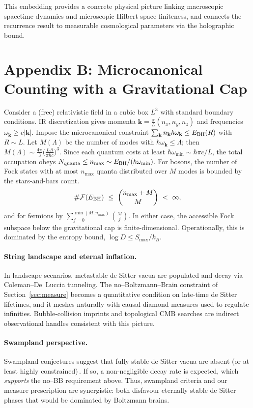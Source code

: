 \documentclass[12pt]{article}
\newcommand{\Smax}{S_{\max}}
\theoremstyle{remark}
\begin{document}
This embedding provides a concrete physical picture linking macroscopic spacetime dynamics and microscopic Hilbert space finiteness, and connects the recurrence result to measurable cosmological parameters via the holographic bound.

\section*{Appendix B: Microcanonical Counting with a Gravitational Cap}
\label{app:microcanonical}

Consider a (free) relativistic field in a cubic box $L^3$ with standard boundary conditions. IR discretization gives momenta $\mathbf k=\frac{\pi}{L}(n_x,n_y,n_z)$ and frequencies $\omega_{\mathbf k}\ge c|\mathbf k|$. Impose the microcanonical constraint $\sum_{\mathbf k} n_{\mathbf k}\hbar\omega_{\mathbf k}\le E_{\rm BH}(R)$ with $R\sim L$.
Let $M(\Lambda)$ be the number of modes with $\hbar\omega_{\mathbf k}\le \Lambda$; then $M(\Lambda)\sim \frac{4\pi}{3}\big(\frac{L\Lambda}{\pi\hbar c}\big)^3$. Since each quantum costs at least $\hbar\omega_{\min}\sim \hbar\pi c/L$, the total occupation obeys $N_{\text{quanta}}\le n_{\max}\sim E_{\rm BH}/(\hbar\omega_{\min})$.
For bosons, the number of Fock states with at most $n_{\max}$ quanta distributed over $M$ modes is bounded by the stars-and-bars count.
\[
\#\mathcal{F}(E_{\rm BH})\ \le\ \binom{n_{\max}+M}{M}\ <\ \infty,
\]
and for fermions by $\sum_{j=0}^{\min(M,n_{\max})}\binom{M}{j}$. In either case, the accessible Fock subspace below the gravitational cap is finite-dimensional. Operationally, this is dominated by the entropy bound, $\log D\le \Smax/k_B$.

\paragraph{String landscape and eternal inflation.}
In landscape scenarios, metastable de Sitter vacua are populated and decay via Coleman–De~Luccia tunneling. The no--Boltzmann--Brain constraint of Section~\ref{sec:measure} becomes a quantitative condition on late-time de Sitter lifetimes, and it meshes naturally with causal-diamond measures used to regulate infinities. Bubble-collision imprints and topological CMB searches are indirect observational handles consistent with this picture.

\paragraph{Swampland perspective.}
Swampland conjectures suggest that fully stable de Sitter vacua are absent (or at least highly constrained)\,\cite{Obied2018,Ooguri2019}. If so, a non-negligible decay rate is expected, which \emph{supports} the no--BB requirement above. Thus, swampland criteria and our measure prescription are synergistic: both disfavour eternally stable de Sitter phases that would be dominated by Boltzmann brains.
\end{document}
